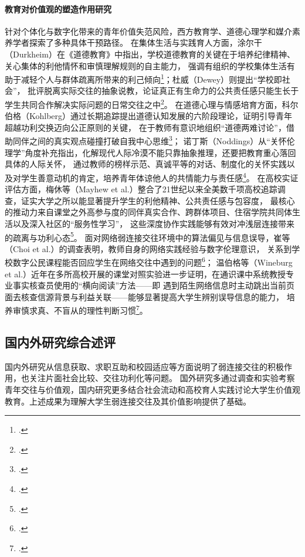 \paragraph{教育对价值观的塑造作用研究}
针对个体化与数字化带来的青年价值失范风险，西方教育学、道德心理学和媒介素养学者探索了多种具体干预路径。
在集体生活与实践育人方面，涂尔干（Durkheim）在《道德教育》中指出，学校道德教育的关键在于培养纪律精神、关心集体的利他情怀和审慎理解规则的自主能力，
强调有组织的学校集体生活有助于减轻个人与群体疏离所带来的利己倾向\footcite{Durkheim2001}；杜威（Dewey）则提出“学校即社会”，
批评脱离实际交往的抽象说教，论证真正有生命力的公共责任感只能生长于学生共同合作解决实际问题的日常交往之中\footcite{Dewey2013}。
在道德心理与情感培育方面，科尔伯格（Kohlberg）通过长期追踪提出道德认知发展的六阶段理论，证明引导青年超越功利交换迈向公正原则的关键，
在于教师有意识地组织“道德两难讨论”，借助同伴之间的真实观点碰撞打破自我中心思维\footcite{Kohlberg1981}；
诺丁斯（Noddings）从“关怀伦理学”角度补充指出，化解现代人际冷漠不能只靠抽象推理，还要把教育重心落回具体的人际关怀，
通过教师的榜样示范、真诚平等的对话、制度化的关怀实践以及对学生善意动机的肯定，培养青年体谅他人的共情能力与责任感\footcite{Noddings2013}。
在高校实证评估方面，梅休等（Mayhew et al.）整合了21世纪以来全美数千项高校追踪调查，证实大学之所以能显著提升学生的利他精神、公共责任感与包容度，
最核心的推动力来自课堂之外高参与度的同伴真实合作、跨群体项目、住宿学院共同体生活以及深入社区的“服务性学习”，
这些深度协作实践能够有效对冲浅层连接带来的疏离与功利心态\footcite{Mayhew2016}。
面对网络弱连接交往环境中的算法偏见与信息误导，崔等（Choi et al.）的调查表明，教师自身的网络实践经验与数字伦理意识，
关系到学校数字公民课程能否回应学生在网络交往中遇到的问题\footcite{Choi2018}；
温伯格等（Wineburg et al.）近年在多所高校开展的课堂对照实验进一步证明，在通识课中系统教授专业事实核查员使用的“横向阅读”方法——即
遇到陌生网络信息时主动跳出当前页面去核查信源背景与利益关联——能够显著提高大学生辨别误导信息的能力，
培养审慎求真、不盲从的理性判断习惯\footcite{Wineburg2022}。

\subsection{国内外研究综合述评}
\label{sec:research-review}

国内外研究从信息获取、求职互助和校园适应等方面说明了弱连接交往的积极作用，也关注片面社会比较、交往功利化等问题。
国外研究多通过调查和实验考察青年交往与价值观，国内研究更多结合社会流动和高校育人实践讨论大学生价值观教育。上述成果为理解大学生弱连接交往及其价值影响提供了基础。

